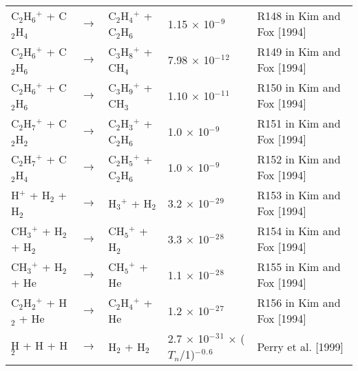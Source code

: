 \documentclass[10pt,a4paper]{jarticle}
\begin{document}
\begin{table}[htb]
{\begin{tabular}{lclll}
 C$_2$H$_6$$^+$ + C$_2$H$_4$     & $\rightarrow$ & C$_2$H$_4$$^+$ + C$_2$H$_6$          & 1.15 $\times$ 10$^-$$^9$ & R148 in Kim and Fox [1994] \\
 C$_2$H$_6$$^+$ + C$_2$H$_6$     & $\rightarrow$ & C$_3$H$_8$$^+$ + CH$_4$           & 7.98 $\times$ 10$^-$$^1$$^2$ & R149 in Kim and Fox [1994] \\
 C$_2$H$_6$$^+$ + C$_2$H$_6$     & $\rightarrow$ & C$_3$H$_9$$^+$ + CH$_3$           & 1.10 $\times$ 10$^-$$^1$$^1$ & R150 in Kim and Fox [1994] \\
 C$_2$H$_7$$^+$ + C$_2$H$_2$     & $\rightarrow$ & C$_2$H$_3$$^+$ + C$_2$H$_6$          & 1.0 $\times$ 10$^-$$^9$ & R151 in Kim and Fox [1994] \\
 C$_2$H$_7$$^+$ + C$_2$H$_4$     & $\rightarrow$ & C$_2$H$_5$$^+$ + C$_2$H$_6$          & 1.0 $\times$ 10$^-$$^9$ & R152 in Kim and Fox [1994] \\
 H$^+$    + H$_2$ + H$_2$ & $\rightarrow$ & H$_3$$^+$   + H$_2$ & 3.2 $\times$ 10$^-$$^2$$^9$ & R153 in Kim and Fox [1994] \\
 CH$_3$$^+$  + H$_2$ + H$_2$ & $\rightarrow$ & CH$_5$$^+$  + H$_2$ & 3.3 $\times$ 10$^-$$^2$$^8$ & R154 in Kim and Fox [1994] \\
 CH$_3$$^+$  + H$_2$ + He & $\rightarrow$ & CH$_5$$^+$  + He & 1.1 $\times$ 10$^-$$^2$$^8$ & R155 in Kim and Fox [1994] \\
 C$_2$H$_2$$^+$ + H$_2$ + He & $\rightarrow$ & C$_2$H$_4$$^+$ + He & 1.2 $\times$ 10$^-$$^2$$^7$ & R156 in Kim and Fox [1994] \\
 H     + H  + H$_2$ & $\rightarrow$ & H$_2$    + H$_2$ & 2.7 $\times$ 10$^-$$^3$$^1$ $\times$ ($T_n$/1)$^-$$^0$$^.$$^6$ & Perry et al. [1999] \\
    \end{tabular}
    }
\end{table}
\end{document}
